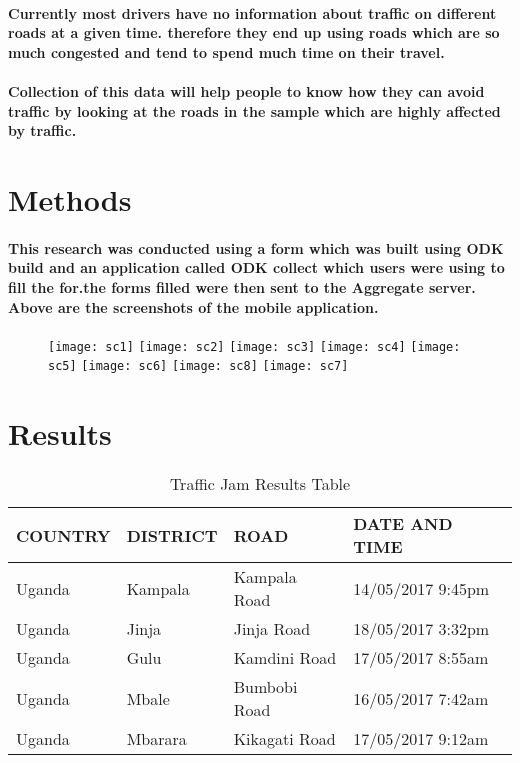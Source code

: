 \documentclass[a4paper,11pt]{article}
\begin{document}
\paragraph{Currently most drivers have no information about traffic  on different roads at a given time. therefore they end up using roads which are so much congested and tend to spend much time on their travel.}
\paragraph{Collection of this data will help people to know how they can avoid traffic by looking at the roads in the sample which are highly affected by traffic.}
\cleardoublepage
\section{Methods}
\paragraph{This research was conducted using a form which was built using ODK build and an application called ODK collect which users were using to fill the for.the forms filled were then sent to the Aggregate server. Above are the screenshots of the mobile application.
 }

 \begin{figure}[h]
\texttt{[image: sc1]}
\texttt{[image: sc2]}
\texttt{[image: sc3]}
\texttt{[image: sc4]}
\texttt{[image: sc5]}
\texttt{[image: sc6]}
\texttt{[image: sc8]}
\texttt{[image: sc7]}
\end{figure}
\cleardoublepage
\section{Results}
\begin{table}[h]
\caption{Traffic Jam Results Table}
\begin{tabular}{|l|l|l|l|}
\hline
COUNTRY &DISTRICT & ROAD& DATE AND TIME\\ \hline
Uganda   & Kampala  & Kampala Road & 14/05/2017 9:45pm \\ \hline
Uganda   & Jinja  & Jinja Road   & 18/05/2017 3:32pm \\ \hline
Uganda  & Gulu & Kamdini Road  & 17/05/2017 8:55am \\ \hline
Uganda  & Mbale & Bumbobi Road  & 16/05/2017 7:42am \\ \hline
Uganda  & Mbarara & Kikagati Road  & 17/05/2017 9:12am \\ \hline
\end{tabular}
\end{table}
\end{document}
